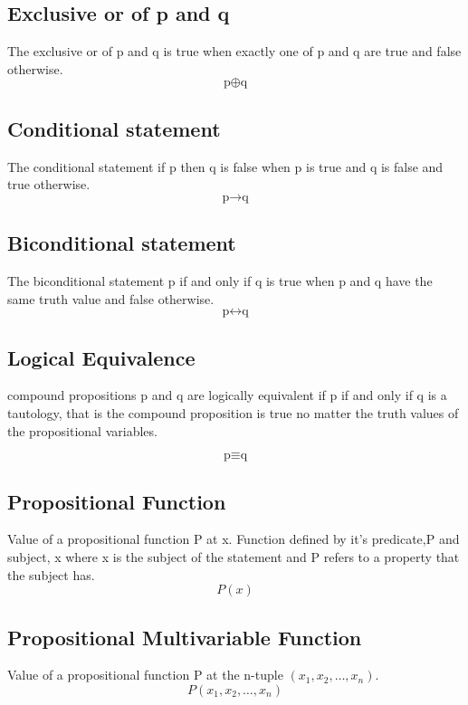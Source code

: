 \documentclass[12pt]{article}
\begin{document}
\subsection{Exclusive or of p and q}
The exclusive or of p and q
is true
when
exactly one of p and q are true
and false otherwise.
\begin{equation}
\mbox{p} \oplus \mbox{q}
\end{equation}

\subsection{Conditional statement}
The conditional statement if p then q
is false
when
p is true and q is false
and true otherwise.
\begin{equation}
\mbox{p} \rightarrow \mbox{q}
\end{equation}

\subsection{Biconditional statement}
The biconditional statement p if and only if q
is true
when
p and q have the same truth value
and false otherwise.
\begin{equation}
\mbox{p} \leftrightarrow \mbox{q}
\end{equation}

\subsection{Logical Equivalence}
compound propositions p and q are logically equivalent if 
p if and only if q is a tautology,
that is the compound proposition is true 
no matter the truth values of the propositional variables.

\begin{equation}
\mbox{p} \equiv \mbox{q}
\end{equation}

\subsection{Propositional Function}
Value of a propositional function P at x.
Function defined by it's predicate,P and subject, x
where
x is the subject of the statement and
P refers to a property that the subject has.
\begin{equation}
P(x)
\end{equation}

\subsection{Propositional Multivariable Function}
Value of a propositional function P at the n-tuple $(x_{1},x_{2},\dots,x_{n})$.
\begin{equation}
P(x_{1},x_{2},\dots,x_{n})
\end{equation}
\end{document}
